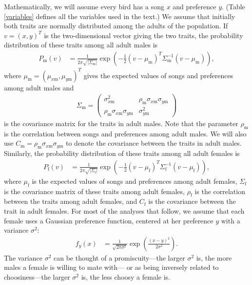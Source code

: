 \documentclass{article}
\newcommand{\x}[1]{\text{#1}}
\begin{document}
Mathematically, we will assume every bird has a song $x$ and preference $y$. (Table \ref{variables} defines all the variables used in the text.) We assume that initially both traits are normally distributed among the adults of the population. 
If $v=(x,y)^T$ is the two-dimensional vector giving the two traits, the probability distribution of these traits among all adult males is 
\begin{align*}
P_\x{m}(v)&=\frac{1}{2\pi\sqrt{|\Sigma_\x{m}|}}\exp\left(-\frac{1}{2}(v-\mu_\x{m})^T\Sigma_\x{m}^{-1}(v-\mu_\x{m})\right),
\end{align*} where $\mu_\x{m}=(\mu_{x\x{m}},\mu_{y\x{m}})^T$ gives the expected values of songs and preferences among adult males and 
\begin{align*}
\Sigma_{\x{m}}=\left(\begin{array}{cc}\sigma_{x\x{m}}^2 & \rho_\x{m}\sigma_{x\x{m}}\sigma_{y\x{m}} \\ \rho_\x{m}\sigma_{x\x{m}}\sigma_{y\x{m}} & \sigma_{y\x{m}}^2 \end{array}\right)
\end{align*}
is the covariance matrix for the traits in adult males. Note that the parameter $\rho_\x{m}$ is the correlation between songs and preferences among adult males. We will also use $C_\x{m}=\rho_\x{m}\sigma_{x\x{m}}\sigma_{y\x{m}}$ to denote the covariance between the traits in adult males. Similarly, the probability distribution of these traits among all adult females is 
\begin{align*}
P_\x{f}(v)&=\frac{1}{2\pi\sqrt{|\Sigma_\x{f}|}}\exp\left(-\frac{1}{2}(v-\mu_\x{f})^T\Sigma_\x{f}^{-1}(v-\mu_\x{f})\right), 
\end{align*}
where $\mu_\x{f}$ is the expected values of songs and preferences among adult females,  $\Sigma_\x{f}$ is the covariance matrix of these traits among adult females, $\rho_\x{f}$ is the correlation between the traits among adult females, and $C_\x{f}$ is the covariance between the trait in adult females. For most of the analyses that follow, we assume that each female uses a Gaussian preference function, centered at her preference $y$ with a variance $\sigma^2$:
\begin{align*}
f_y(x)&=\frac{1}{\sqrt{2\pi\sigma^2}}\exp\left(\frac{(x-y)^2}{2\sigma^2}\right).
\end{align*}
The variance $\sigma^2$ can be thought of a promiscuity---the larger $\sigma^2$ is, the more males a female is willing to mate with--- or as being inversely related to choosiness---the larger $\sigma^2$ is, the less choosy a female is. 
\end{document}
